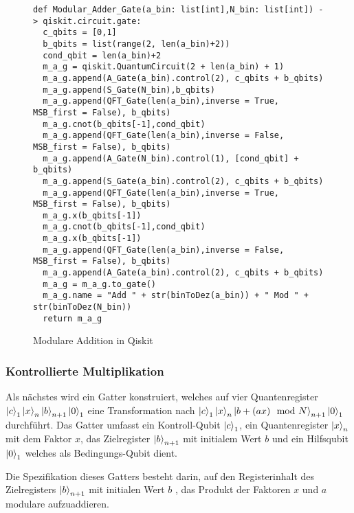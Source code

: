 \begin{figure}[H]
  \caption{Modulare Addition in Qiskit}
  \label{code:ModularAddition}
\begin{verbatim}    
def Modular_Adder_Gate(a_bin: list[int],N_bin: list[int]) -> qiskit.circuit.gate:
  c_qbits = [0,1]
  b_qbits = list(range(2, len(a_bin)+2))
  cond_qbit = len(a_bin)+2
  m_a_g = qiskit.QuantumCircuit(2 + len(a_bin) + 1) 
  m_a_g.append(A_Gate(a_bin).control(2), c_qbits + b_qbits)
  m_a_g.append(S_Gate(N_bin),b_qbits)
  m_a_g.append(QFT_Gate(len(a_bin),inverse = True, MSB_first = False), b_qbits)
  m_a_g.cnot(b_qbits[-1],cond_qbit)
  m_a_g.append(QFT_Gate(len(a_bin),inverse = False, MSB_first = False), b_qbits)
  m_a_g.append(A_Gate(N_bin).control(1), [cond_qbit] + b_qbits)
  m_a_g.append(S_Gate(a_bin).control(2), c_qbits + b_qbits)
  m_a_g.append(QFT_Gate(len(a_bin),inverse = True, MSB_first = False), b_qbits)
  m_a_g.x(b_qbits[-1])
  m_a_g.cnot(b_qbits[-1],cond_qbit)
  m_a_g.x(b_qbits[-1])
  m_a_g.append(QFT_Gate(len(a_bin),inverse = False, MSB_first = False), b_qbits)
  m_a_g.append(A_Gate(a_bin).control(2), c_qbits + b_qbits)
  m_a_g = m_a_g.to_gate()
  m_a_g.name = "Add " + str(binToDez(a_bin)) + " Mod " + str(binToDez(N_bin))
  return m_a_g
  \end{verbatim}
\end{figure}

\subsubsection{Kontrollierte Multiplikation}
Als nächstes wird ein Gatter konstruiert, welches auf vier Quantenregister \(\ket{c}_1\ket{x}_{n}\ket{b}_{n+1}\ket{0}_1\)
eine Transformation nach \(\ket{c}_1\ket{x}_{n}\ket{b + (ax)\mod N}_{n+1}\ket{0}_1\) durchführt.
Das Gatter umfasst ein Kontroll-Qubit \(\ket{c}_1\), 
ein Quantenregister \(\ket{x}_{n}\) mit dem Faktor \(x\),
das Zielregister \(\ket{b}_{n+1}\) mit initialem Wert \(b\) und 
ein Hilfsqubit \(\ket{0}_1\) welches als Bedingungs-Qubit dient.

Die Spezifikation dieses Gatters besteht darin, 
auf den Registerinhalt des Zielregisters \(\ket{b}_{n+1}\) mit initialen Wert \(b\) , 
das Produkt der Faktoren \(x\) und \(a\) modulare aufzuaddieren.

